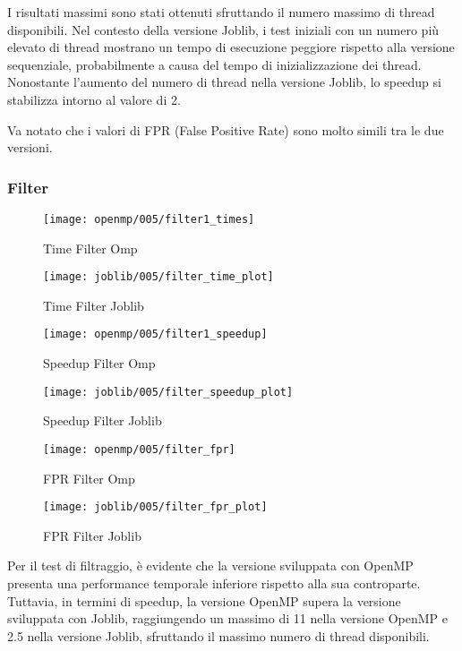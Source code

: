 I risultati massimi sono stati ottenuti sfruttando il numero massimo di thread disponibili.
Nel contesto della versione Joblib, i test iniziali con un numero più elevato di thread mostrano un tempo di esecuzione
peggiore rispetto alla versione sequenziale, probabilmente a causa del tempo di inizializzazione dei thread.
Nonostante l'aumento del numero di thread nella versione Joblib, lo speedup si stabilizza intorno al valore di 2.

Va notato che i valori di FPR (False Positive Rate) sono molto simili tra le due versioni.

\subsubsection{Filter}\label{subsubsec:fpr-005-filter}
\begin{figure}[H]
    \centering
    \texttt{[image: openmp/005/filter1\_times]}
        \caption{Time Filter Omp}\label{fig:005-filter_time_omp}
    \endminipage\hfill
    \texttt{[image: joblib/005/filter\_time\_plot]}
        \caption{Time Filter Joblib}\label{fig:005-filter_time_joblib}
    \endminipage\hfill
\end{figure}
\begin{figure}[H]
    \centering
    \texttt{[image: openmp/005/filter1\_speedup]}
        \caption{Speedup Filter Omp}\label{fig:005-filter_speedup_omp}
    \endminipage\hfill
    \texttt{[image: joblib/005/filter\_speedup\_plot]}
        \caption{Speedup Filter Joblib}\label{fig:005-filter_speedup_joblib}
    \endminipage\hfill
\end{figure}
\begin{figure}[H]
    \centering
    \texttt{[image: openmp/005/filter\_fpr]}
        \caption{FPR Filter Omp}\label{fig:005-filter_fpr_omp}
    \endminipage\hfill
    \texttt{[image: joblib/005/filter\_fpr\_plot]}
        \caption{FPR Filter Joblib}\label{fig:005-filter_fpr_joblib}
    \endminipage\hfill
\end{figure}

Per il test di filtraggio, è evidente che la versione sviluppata con OpenMP presenta una performance temporale
inferiore rispetto alla sua controparte.
Tuttavia, in termini di speedup, la versione OpenMP supera la versione sviluppata con Joblib, raggiungendo un
massimo di 11 nella versione OpenMP e 2.5 nella versione Joblib, sfruttando il massimo numero di thread disponibili.

